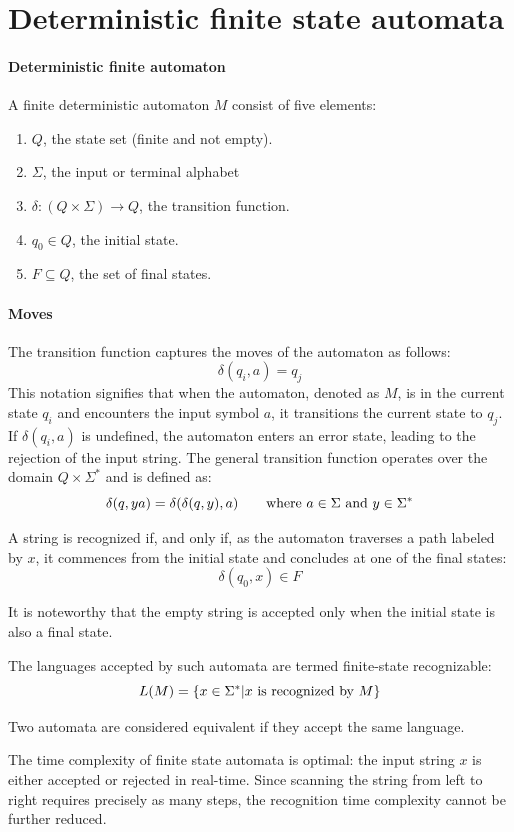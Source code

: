 \section{Deterministic finite state automata}

\paragraph*{Deterministic finite automaton}
A finite deterministic automaton $M$ consist of five elements:
\begin{enumerate}
    \item $Q$, the state set (finite and not empty). 
    \item $\Sigma$, the input or terminal alphabet
    \item $\delta:(Q \times \Sigma) \rightarrow Q$, the transition function.
    \item $q_0 \in Q$, the initial state. 
    \item $F\subseteq Q$, the set of final states.
\end{enumerate}

\paragraph*{Moves}
The transition function captures the moves of the automaton as follows:
\[\delta(q_i,a)=q_j\]
This notation signifies that when the automaton, denoted as $M$, is in the current state $q_i$ and encounters the input symbol $a$, it transitions the current state to $q_j$. 
If $\delta(q_i, a)$ is undefined, the automaton enters an error state, leading to the rejection of the input string.
The general transition function operates over the domain $Q \times \Sigma^{*}$ and is defined as:
\[\delta(q,ya)=\delta(\delta(q,y),a) \qquad \textnormal{where } a \in \Sigma \textnormal{ and }y \in \Sigma^{*}\]
\begin{definition}
    A string is recognized if, and only if, as the automaton traverses a path labeled by $x$, it commences from the initial state and concludes at one of the final states:
    \[\delta(q_0,x) \in F\]
\end{definition}
It is noteworthy that the empty string is accepted only when the initial state is also a final state.
\begin{definition}
    The languages accepted by such automata are termed finite-state recognizable:
    \[L(M)=\{x \in \Sigma^{*}|x \textnormal{ is recognized by } M\}\]
\end{definition}
\begin{definition}
    Two automata are considered equivalent if they accept the same language.
\end{definition}
The time complexity of finite state automata is optimal: the input string $x$ is either accepted or rejected in real-time. 
Since scanning the string from left to right requires precisely as many steps, the recognition time complexity cannot be further reduced.

